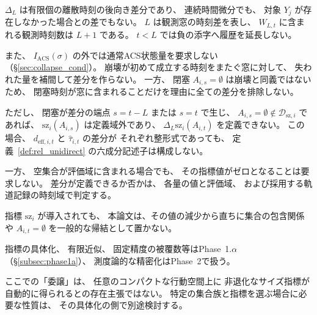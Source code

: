 \begin{remark}[有限観測窓差分の制限とサイズ汎関数の委譲]
\label{rem:finite_window_diff_limit}
$\Delta_L$ は有限個の離散時刻の後向き差分であり、
連続時間微分でも、
対象 $Y_j$ が存在しなかった場合との差でもない。
$L$ は観測窓の時刻差を表し、
$W_{L,t}$ に含まれる観測時刻数は $L+1$ である。
$t<L$ では負の添字へ履歴を延長しない。

また、
$I_{\mathrm{ACS}}(\sigma)$ の外では通常ACS状態量を要求しない
（\S\ref{sec:collapse_cond}）。
崩壊が初めて成立する時刻をまたぐ窓に対して、
失われた量を補間して差分を作らない。
一方、
閉塞 $A_{i,s}=\emptyset$ は崩壊と同義ではないため、
閉塞時刻が窓に含まれることだけを理由に全ての差分を排除しない。

ただし、
閉塞が差分の端点 $s=t-L$ または $s=t$ で生じ、
$A_{i,s}=\emptyset\notin\mathcal D_{\mathrm{sz},i}$ であれば、
$\mathrm{sz}_i(A_{i,s})$ は定義域外であり、
$\Delta_L\mathrm{sz}_i(A_{i,t})$ を定義できない。
この場合、
$d_{\mathrm{eff},i,t}$ と $\widehat\tau_{i,t}$ の差分が
それぞれ整形式であっても、
定義~\ref{def:rel_unidirect} の六成分記述子は構成しない。

一方、
空集合が評価域に含まれる場合でも、
その指標値がゼロとなることは要求しない。
差分が定義できるか否かは、
各量の値と評価域、
および採用する軌道記録の時刻域で判定する。

指標 $\mathrm{sz}_i$ が導入されても、
本論文は、その値の減少から直ちに集合の包含関係や
$A_{i,t}=\emptyset$ を一般的な帰結として置かない。

指標の具体化、
有限近似、
固定精度の被覆数等はPhase~1.$\alpha$（\S\ref{subsec:phase1a}）、
測度論的な精密化はPhase~2で扱う。

ここでの「委譲」は、
任意のコンパクトな行動空間上に
非退化なサイズ指標が自動的に得られるとの存在主張ではない。
特定の集合族と指標を選ぶ場合に必要な性質は、
その具体化の側で別途検討する。
\end{remark}


